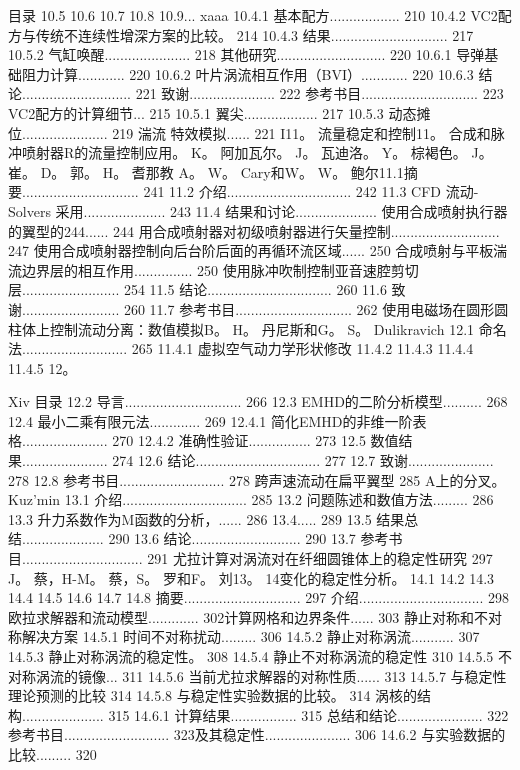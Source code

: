 \documentclass[UTF8,11pt,a4paper,openany,fontset=fandol]{ctexbook}
\begin{document}
目录 10.5 10.6 10.7 10.8 10.9... xaaa 10.4.1 基本配方.................. 210 10.4.2 VC2配方与传统不连续性增深方案的比较。 214 10.4.3 结果.............................. 217 10.5.2 气缸唤醒...................... 218 其他研究............................ 220 10.6.1 导弹基础阻力计算............ 220 10.6.2 叶片涡流相互作用（BVI）............ 220 10.6.3 结论............................ 221 致谢...................... 222 参考书目.............................. 223 VC2配方的计算细节... 215 10.5.1 翼尖................... 217 10.5.3 动态摊位...................... 219 湍流 特效模拟...... 221 I11。 流量稳定和控制11。 合成和脉冲喷射器R的流量控制应用。 K。 阿加瓦尔。 J。 瓦迪洛。 Y。 棕褐色。 J。 崔。 D。 郭。 H。 耆那教 A。 W。 Cary和W。 W。 鲍尔11.1摘要.............................. 241 11.2 介绍................................ 242 11.3 CFD 流动-Solvers 采用..................... 243 11.4 结果和讨论..................... 使用合成喷射执行器的翼型的244...... 244 用合成喷射器对初级喷射器进行矢量控制............................ 247 使用合成喷射器控制向后台阶后面的再循环流区域...... 250 合成喷射与平板湍流边界层的相互作用............... 250 使用脉冲吹制控制亚音速腔剪切层......................... 254 11.5 结论................................ 260 11.6 致谢......................... 260 11.7 参考书目.............................. 262 使用电磁场在圆形圆柱体上控制流动分离：数值模拟B。 H。 丹尼斯和G。 S。 Dulikravich 12.1 命名法........................... 265 11.4.1 虚拟空气动力学形状修改 11.4.2 11.4.3 11.4.4 11.4.5 12。

Xiv 目录 12.2 导言.............................. 266 12.3 EMHD的二阶分析模型.......... 268 12.4 最小二乘有限元法............. 269 12.4.1 简化EMHD的非维一阶表格...................... 270 12.4.2 准确性验证................ 273 12.5 数值结果...................... 274 12.6 结论................................ 277 12.7 致谢...................... 278 12.8 参考书目........................... 278 跨声速流动在扁平翼型 285 A上的分叉。 Kuz'min 13.1 介绍................................ 285 13.2 问题陈述和数值方法......... 286 13.3 升力系数作为M函数的分析，...... 286 13.4..... 289 13.5 结果总结..................... 290 13.6 结论............................ 290 13.7 参考书目............................... 291 尤拉计算对涡流对在纤细圆锥体上的稳定性研究 297 J。 蔡，H-M。 蔡，S。 罗和F。 刘13。 14变化的稳定性分析。 14.1 14.2 14.3 14.4 14.5 14.6 14.7 14.8 摘要.............................. 297 介绍................................ 298 欧拉求解器和流动模型............. 302计算网格和边界条件...... 303 静止对称和不对称解决方案 14.5.1 时间不对称扰动......... 306 14.5.2 静止对称涡流........... 307 14.5.3 静止对称涡流的稳定性。 308 14.5.4 静止不对称涡流的稳定性 310 14.5.5 不对称涡流的镜像... 311 14.5.6 当前尤拉求解器的对称性质...... 313 14.5.7 与稳定性理论预测的比较 314 14.5.8 与稳定性实验数据的比较。 314 涡核的结构..................... 315 14.6.1 计算结果................. 315 总结和结论...................... 322 参考书目........................... 323及其稳定性...................... 306 14.6.2 与实验数据的比较......... 320
\end{document}
